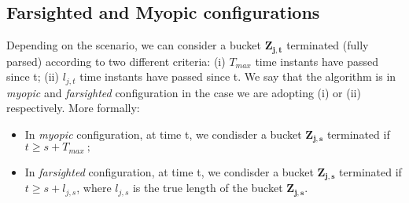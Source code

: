 \subsection{Farsighted and Myopic configurations}

Depending on the scenario, we can consider a bucket $\boldsymbol{Z_{j,t}}$ terminated (fully parsed) according to two different criteria: (i) $T_{max}$ time instants have passed since t; (ii) $l_{j,t}$ time instants have passed since t. We say that the algorithm is in \emph{myopic} and \emph{farsighted} configuration in the case we are adopting (i) or (ii) respectively. More formally:
\begin{itemize}
	\item In \emph{myopic} configuration, at time t, we condisder a bucket $\boldsymbol{Z_{j,s}}$ terminated if $t\geq s+T_{max} \ ;$
	\item In \emph{farsighted} configuration, at time t, we condisder a bucket $\boldsymbol{Z_{j,s}}$ terminated if $t \geq s+l_{j,s}$, where $l_{j,s}$ is the true length of the bucket $\boldsymbol{Z_{j,s}}$.
	
\end{itemize}

%	
%	
%	


